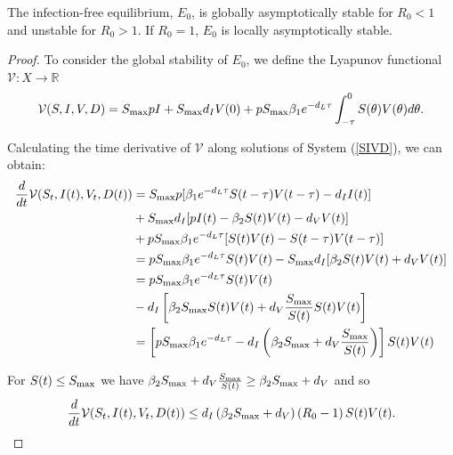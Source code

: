 \documentclass{CMHPhD-SIVD}
\begin{document}
\begin{theorem}\label{thm2}
 The infection-free equilibrium, $E_0$, is globally asymptotically stable for $R_0 < 1$ and unstable for $R_0 >1$.  If $R_0 = 1$, $E_0$ is locally asymptotically stable.
 \end{theorem}

\begin{proof} To consider the global stability of $E_0$, we define the Lyapunov functional  $\mathcal{V}: X\rightarrow\mathbb{R}$
\begin{equation}\label{34}
\mathcal{V}(S,I,V,D) = S_{\text{max}} p I+S_{\text{max}} d_I V(0)+p S_{\text{max}} \beta_1 e^{-d_L \tau}\int_{-\tau}^0S(\theta)V(\theta)d\theta.
\end{equation}

Calculating the time derivative of $\mathcal{V}$ along solutions of System (\ref{SIVD}), we can obtain:
\begin{align*}%
\frac{d}{dt}\mathcal{V}(S_t,I(t),V_t,D(t))&=\Smax p[\beta_1 e^{-d_L \tau}S(t-\tau)V(t-\tau)-d_I I(t)]\nonumber \\
&+\Smax d_I[pI(t)-\beta_2 S(t)V(t)-d_V V(t)]\nonumber \\
&+p \Smax \beta_1 e^{-d_L \tau}[S(t)V(t)-S(t-\tau)V(t-\tau)]\nonumber \\
&=p \Smax \beta_1 e^{-d_L \tau}S(t)V(t)-\Smax d_I[\beta_2 S(t)V(t)+d_V V(t)]\nonumber \\
&=p \Smax \beta_1 e^{-d_L \tau}S(t)V(t)\nonumber \\
&-d_I\left[\beta_2 \Smax S(t)V(t)+d_V \frac{\Smax}{S(t)} S(t)V(t)\right]
\nonumber \\
&= \left[p \Smax \beta_1 e^{-d_L \tau}-d_I\left(\beta_2 \Smax+d_V \frac{\Smax}{S(t)}\right)\right]S(t)V(t)\nonumber
\end{align*}

For $S(t) \le S_{\text{max}}$ we have $\beta_2 S_{\text{max}}+d_V \frac{S_{\text{max}}}{S(t)} \ge \beta_2 S_{\text{max}}+d_V $ and so
	\begin{equation}\label{35}
		\frac{d}{dt}\mathcal{V}(S_t,I(t),V_t,D(t))\le d_I\left(\beta_2 S_{\text{max}}+d_V\right)\left(R_0-1\right)S(t)V(t).
	\end{equation}


\end{proof}
\end{document}
